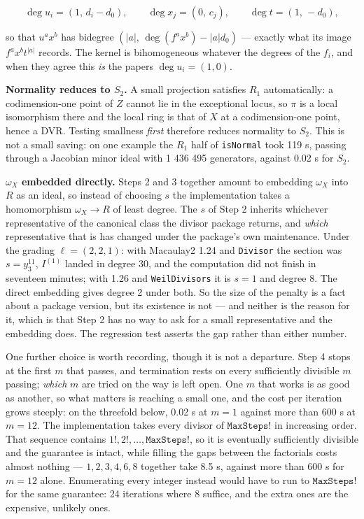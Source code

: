 \documentclass[11pt,reqno]{amsart}
\theoremstyle{plain}
\theoremstyle{definition}
\begin{document}
\[\deg u_i = (1,\, d_i - d_0), \qquad \deg x_j = (0,\, c_j), \qquad
\deg t = (1,\, -d_0),\]

so that \(u^a x^b\) has bidegree \((|a|,\, \deg(f^a x^b) - |a| d_0)\)
--- exactly what its image \(f^a x^b t^{|a|}\) records. The kernel is
bihomogeneous whatever the degrees of the \(f_i\), and when they agree
this \emph{is} the paper\textquotesingle s \(\deg u_i = (1,0)\).

\textbf{Normality reduces to \(S_2\).} A small projection satisfies
\(R_1\) automatically: a codimension-one point of \(Z\) cannot lie in
the exceptional locus, so \(\pi\) is a local isomorphism there and the
local ring is that of \(X\) at a codimension-one point, hence a DVR.
Testing smallness \emph{first} therefore reduces normality to \(S_2\).
This is not a small saving: on one example the \(R_1\) half of
\texttt{isNormal} took 119 s, passing through a Jacobian minor ideal
with 1 436 495 generators, against 0.02 s for \(S_2\).

\textbf{\(\omega_X\) embedded directly.} Steps 2 and 3 together amount
to embedding \(\omega_X\) into \(R\) as an ideal, so instead of choosing
\(s\) the implementation takes a homomorphism \(\omega_X \to R\) of
least degree. The \(s\) of Step 2 inherits whichever representative of
the canonical class the divisor package returns, and \emph{which}
representative that is has changed under the package's own maintenance.
Under the grading \(\ell = (2,2,1)\): with Macaulay2 1.24 and
\texttt{Divisor} the section was \(s = y_3^{11}\), \(I^{(1)}\) landed in
degree 30, and the computation did not finish in seventeen minutes; with
1.26 and \texttt{WeilDivisors} it is \(s = 1\) and degree 8. The direct
embedding gives degree 2 under both. So the size of the penalty is a
fact about a package version, but its existence is not --- and neither
is the reason for it, which is that Step 2 has no way to ask for a small
representative and the embedding does. The regression test asserts the
gap rather than either number.

One further choice is worth recording, though it is not a departure.
Step 4 stops at the first \(m\) that passes, and termination rests on
every sufficiently divisible \(m\) passing; \emph{which} \(m\) are tried
on the way is left open. One \(m\) that works is as good as another, so
what matters is reaching a small one, and the cost per iteration grows
steeply: on the threefold below, 0.02 s at \(m = 1\) against more than
600 s at \(m = 12\). The implementation takes every divisor of
\(\texttt{MaxSteps}!\) in increasing order. That sequence contains
\(1!, 2!, \dots, \texttt{MaxSteps}!\), so it is eventually sufficiently
divisible and the guarantee is intact, while filling the gaps between
the factorials costs almost nothing --- \(1,2,3,4,6,8\) together take
8.5 s, against more than 600 s for \(m = 12\) alone. Enumerating every
integer instead would have to run to \(\texttt{MaxSteps}!\) for the same
guarantee: 24 iterations where 8 suffice, and the extra ones are the
expensive, unlikely ones.
\end{document}

